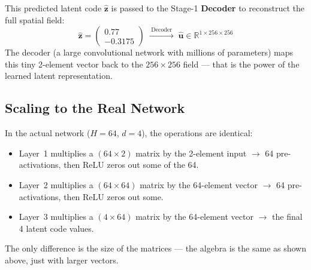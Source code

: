 \documentclass[11pt,a4paper]{article}
\newcommand{\R}{\mathbb{R}}
\newcommand{\bz}{\mathbf{z}}
\begin{document}
This predicted latent code $\hat{\bz}$ is passed to the Stage-1
\textbf{Decoder} to reconstruct the full spatial field:
\[
  \hat{\bz} = \begin{pmatrix} 0.77 \\ -0.3175 \end{pmatrix}
  \;\xrightarrow{\;\text{Decoder}\;}\;
  \hat{\mathbf{u}} \in \R^{1 \times 256 \times 256}
\]
The decoder (a large convolutional network with millions of parameters)
maps this tiny 2-element vector back to the $256\times256$ field ---
that is the power of the learned latent representation.

\subsection{Scaling to the Real Network}

In the actual network ($H=64$, $d=4$), the operations are identical:
\begin{itemize}[leftmargin=2em]
  \item Layer~1 multiplies a $(64\times2)$ matrix by the 2-element input
    $\to$ 64 pre-activations, then ReLU zeros out some of the 64.
  \item Layer~2 multiplies a $(64\times64)$ matrix by the 64-element vector
    $\to$ 64 pre-activations, then ReLU zeros out some.
  \item Layer~3 multiplies a $(4\times64)$ matrix by the 64-element vector
    $\to$ the final 4 latent code values.
\end{itemize}
The only difference is the size of the matrices --- the algebra is the
same as shown above, just with larger vectors.
\end{document}
